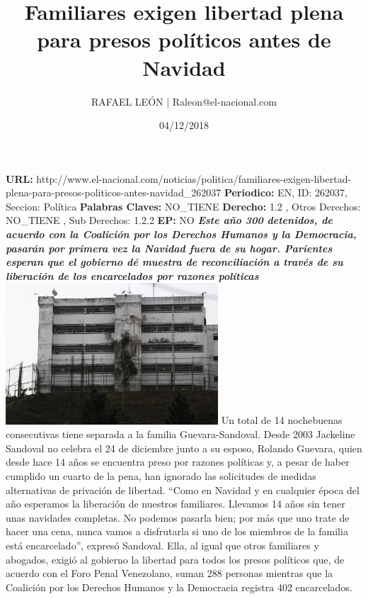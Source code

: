\documentclass{article}%
\title{\textbf{Familiares exigen libertad plena para presos políticos antes de Navidad}}%
\author{RAFAEL LEÓN | Raleon@el{-}nacional.com}%
\date{04/12/2018}%
\begin{document}
%
\normalsize%
\maketitle%
\textbf{URL: }%
http://www.el{-}nacional.com/noticias/politica/familiares{-}exigen{-}libertad{-}plena{-}para{-}presos{-}politicos{-}antes{-}navidad\_262037\newline%
%
\textbf{Periodico: }%
EN, %
ID: %
262037, %
Seccion: %
Política\newline%
%
\textbf{Palabras Claves: }%
NO\_TIENE\newline%
%
\textbf{Derecho: }%
1.2%
, Otros Derechos: %
NO\_TIENE%
, Sub Derechos: %
1.2.2%
\newline%
%
\textbf{EP: }%
NO\newline%
\newline%
%
\textbf{\textit{Este año 300 detenidos, de acuerdo con la Coalición por los Derechos Humanos y la Democracia, pasarán por primera vez la Navidad fuera de su hogar. Parientes esperan que el gobierno dé muestra de reconciliación a través de su liberación de los encarcelados por razones políticas}}%
\newline%
\newline%
%
\includegraphics[width=300px]{215.jpg}%
\newline%
%
Un total de 14 nochebuenas consecutivas tiene separada a la familia Guevara{-}Sandoval. Desde 2003 Jackeline Sandoval no celebra el 24 de diciembre junto a su esposo, Rolando Guevara, quien desde hace 14 años se encuentra preso por razones políticas y, a pesar de haber cumplido un cuarto de la pena, han ignorado las solicitudes de medidas alternativas de privación de libertad.%
\newline%
%
“Como en Navidad y en cualquier época del año esperamos la liberación de nuestros familiares. Llevamos 14 años sin tener unas navidades completas. No podemos pasarla bien; por más que uno trate de hacer una cena, nunca vamos a disfrutarla si uno de los miembros de la familia está encarcelado”, expresó Sandoval. Ella, al igual que otros familiares y abogados, exigió al gobierno la libertad para todos los presos políticos que, de acuerdo con el Foro Penal Venezolano, suman 288 personas mientras que la Coalición por los Derechos Humanos y la Democracia registra 402 encarcelados.%
\end{document}
